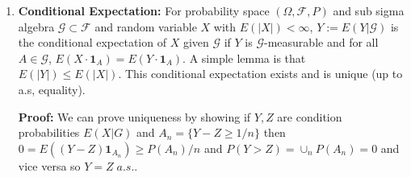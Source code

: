 \documentclass{article}
\begin{document}
\begin{enumerate}
    \item \textbf{Conditional Expectation:} For probability space \((\Omega, \mathcal{F}, P)\) and sub sigma algebra \(\mathcal{G}\subset \mathcal{F}\) and random variable \(X\) with \(E(|X|) < \infty\), \(Y:= E(Y|\mathcal{G})\) is the conditional expectation of \(X\) given \(\mathcal{G}\) if \(Y\) is \(\mathcal{G}\)-measurable and for all \(A \in \mathcal{G}\), \(E(X \cdot \textbf{1}_A) = E(Y \cdot \textbf{1}_A)\). A simple lemma is that \(E(|Y|) \leq E(|X|)\). This conditional expectation exists and is unique (up to a.s, equality).

    \textbf{Proof:} We can prove uniqueness by showing if \(Y, Z\) are condition probabilities \(E(X|G)\) and \(A_n = \{Y-Z \geq 1/n\}\) then \(0=E((Y-Z)\mathbf{1}_{A_n}) \geq P(A_n)/n\) and \(P(Y>Z) = \cup_nP(A_n) = 0\) and vice versa so \(Y = Z \; a.s.\).


\end{enumerate}
\end{document}
